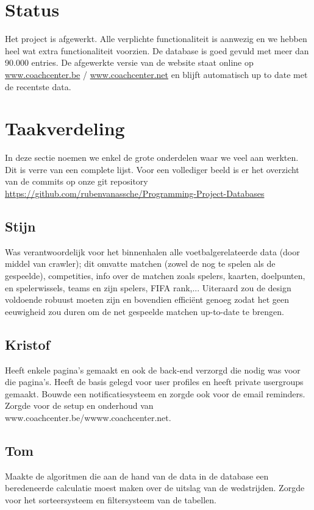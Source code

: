 \documentclass[11pt, a4paper]{article}
\begin{document}
\title{}
\author{Groep A\\ Eindrapport}
\date{27 mei 2014}
\maketitle

\section{Status}
Het project is afgewerkt. Alle verplichte functionaliteit is aanwezig en we hebben heel wat extra functionaliteit voorzien. De database is goed gevuld met meer dan 90.000 entries. De afgewerkte versie van de website staat online op \url{www.coachcenter.be} / \url{www.coachcenter.net} en blijft automatisch up to date met de recentste data.
\section{Taakverdeling}
In deze sectie noemen we enkel de grote onderdelen waar we veel aan werkten. Dit is verre van een complete lijst. Voor een vollediger beeld is er het overzicht van de commits op onze git repository \\ \url{https://github.com/rubenvanassche/Programming-Project-Databases}
\subsection{Stijn}
Was verantwoordelijk voor het binnenhalen alle voetbalgerelateerde data (door middel van crawler); dit omvatte matchen (zowel de nog te spelen als de gespeelde), competities, info over de matchen zoals spelers, kaarten, doelpunten, en spelerwissels, teams en zijn spelers, FIFA rank,... Uiteraard zou de design voldoende robuust moeten zijn en bovendien effici\"ent genoeg zodat het geen eeuwigheid zou duren om de net gespeelde matchen up-to-date te brengen.
\subsection{Kristof}
Heeft enkele pagina's gemaakt en ook de back-end verzorgd die nodig was voor die pagina's. Heeft de basis gelegd voor user profiles en heeft private usergroups gemaakt. Bouwde een notificatiesysteem en zorgde ook voor de email reminders. Zorgde voor de setup en onderhoud van www.coachcenter.be/wwww.coachcenter.net.
\subsection{Tom}
Maakte de algoritmen die aan de hand van de data in de database een beredeneerde calculatie moest maken over de uitslag van de wedstrijden.
Zorgde voor het sorteersysteem en filtersysteem van de tabellen.
\end{document}
